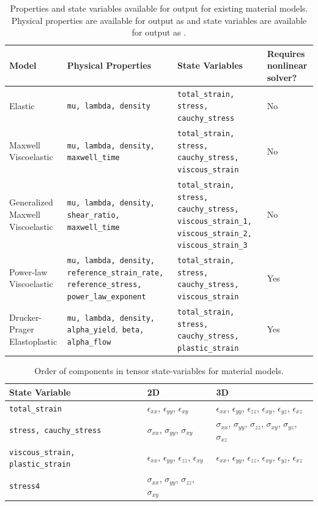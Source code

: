\begin{table}[htbp]
\caption{Properties and state variables available for output for
  existing material models. Physical properties are available for
  output as  and state variables are
  available for output as .}
\label{tab:materials:output}

\begin{tabular}{p{1.5in}p{1.8in}p{1.5in}p{1in}}
\textbf{Model} & \textbf{Physical Properties} & \textbf{State Variables} & \textbf{Requires nonlinear solver?}\tabularnewline
\hline 
Elastic & \texttt{mu, lambda, density} & \texttt{total\_strain, stress, cauchy\_stress} & No\\
Maxwell Viscoelastic & \texttt{mu, lambda, density, maxwell\_time} & \texttt{total\_strain,} \texttt{stress, cauchy\_stress, viscous\_strain} & No\\
Generalized Maxwell Viscoelastic & \texttt{mu, lambda, density,} \texttt{shear\_ratio,} \texttt{maxwell\_time} & \texttt{total\_strain, stress, cauchy\_stress, viscous\_strain\_1,} \texttt{viscous\_strain\_2,} \texttt{viscous\_strain\_3} & No\\
Power-law Viscoelastic & \texttt{mu, lambda, density,} \texttt{reference\_strain\_rate, reference\_stress,} 
\texttt{power\_law\_exponent} & \texttt{total\_strain, stress, cauchy\_stress, viscous\_strain} & Yes\\
Drucker-Prager Elastoplastic & \texttt{mu, lambda, density, alpha\_yield},\texttt{ beta, alpha\_flow } & \texttt{total\_strain, stress, cauchy\_stress, plastic\_strain} & Yes\\
\hline 
\end{tabular}
\end{table}

\begin{table}[htbp]
\caption{Order of components in tensor state-variables for material models.}
\label{tab:materials:statevars}
\begin{tabular}{p{2.5in}p{1.5in}p{2.0in}}
\textbf{State Variable} & \textbf{2D} & \textbf{3D}\\
\hline 
\texttt{total\_strain} & $\epsilon_{xx}$, $\epsilon_{yy}$, $\epsilon_{xy}$ & $\epsilon_{xx}$, $\epsilon_{yy}$, $\epsilon_{zz}$, $\epsilon_{xy}$,
$\epsilon_{yz}$, $\epsilon_{xz}$\\
\texttt{stress, cauchy\_stress} & $\sigma_{xx}$, $\sigma_{yy}$, $\sigma_{xy}$ & $\sigma_{xx}$, $\sigma_{yy}$, $\sigma_{zz}$, $\sigma_{xy}$, $\sigma_{yz}$,
$\sigma_{xz}$\\
\texttt{viscous\_strain, plastic\_strain} & $\epsilon_{xx}$, $\epsilon_{yy}$, $\epsilon_{zz}$, $\epsilon_{xy}$ & $\epsilon_{xx}$, $\epsilon_{yy}$, $\epsilon_{zz}$, $\epsilon_{xy}$,
$\epsilon_{yz}$, $\epsilon_{xz}$\\
\texttt{stress4} & $\sigma_{xx}$, $\sigma_{yy}$, $\sigma_{zz}$, $\sigma_{xy}$ & \\
\hline 
\end{tabular}
\end{table}


